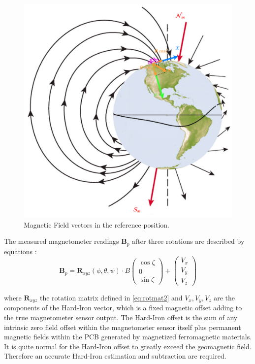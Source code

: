 \begin{figure}[ht]
    \centering
    \includegraphics[scale=0.4]{images/magnetic_field_axis.pdf}
    \caption{Magnetic Field vectors in the reference position. \ensuremath{}}  
\end{figure}

The measured magnetometer readings \ensuremath{\boldsymbol{B}_{p}} after three rotations are described by equations :
\begin{equation}
    \boldsymbol{B}_{p}=\boldsymbol{R}_{\mathit{xyz}}(\phi,\theta,\psi)\cdot B\left(\begin{array}{c}{\cos \zeta} \\ {0} \\ {\sin \zeta}\end{array}\right) + \left(\begin{array}{c}{V_x} \\ {V_y} \\ {V_z}\end{array}\right)
    \label{eq:b14}
\end{equation}  

where \ensuremath{\boldsymbol{R}_{\mathit{xyz}}} the rotation matrix defined in \cref{eq:rotmat2} and \ensuremath{V_x,V_y,V_z} are the components of the Hard-Iron vector,  which is a fixed magnetic offset adding to the true magnetometer sensor output. The Hard-Iron offset is the sum of any intrinsic zero field offset within the magnetometer sensor itself plus permanent magnetic fields within the PCB generated by magnetized ferromagnetic materials. It is quite normal for the Hard-Iron offset to greatly exceed the geomagnetic field.  Therefore an accurate Hard-Iron estimation and subtraction are required.

